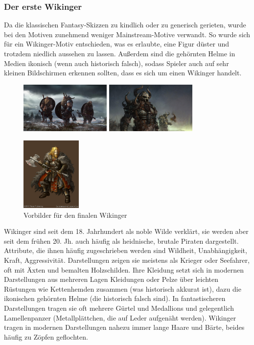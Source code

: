 \documentclass[extern,palatino]{cgBA}
\begin{document}
\subsubsection{Der erste Wikinger}
Da die klassischen Fantasy-Skizzen zu kindlich oder zu generisch gerieten, wurde bei den Motiven zunehmend weniger Mainstream-Motive verwandt. So wurde sich für ein Wikinger-Motiv entschieden, was es erlaubte, eine Figur düster und trotzdem niedlich aussehen zu lassen. Außerdem sind die gehörnten Helme in Medien ikonisch (wenn auch historisch falsch), sodass Spieler auch auf sehr kleinen Bildschirmen erkennen sollten, dass es sich um einen Wikinger handelt.
\begin{figure}[H]
	\raggedleft
	\includegraphics[width=4.5cm]{vikingwallpaper.jpg}
	\centering
	\includegraphics[width=4.5cm]{vikingwallpaper2.jpg}
	\raggedright
	\includegraphics[width=3cm]{vikingwallpaper3.jpg}
	\caption{Vorbilder für den finalen Wikinger}
	\label{inspirations}
\end{figure}
Wikinger sind seit dem 18. Jahrhundert als noble Wilde verklärt, sie werden aber seit dem frühen 20. Jh. auch häufig als heidnische, brutale Piraten dargestellt. Attribute, die ihnen häufig zugeschrieben werden sind Wildheit, Unabhängigkeit, Kraft, Aggressivität. Darstellungen zeigen sie meistens als Krieger oder Seefahrer, oft mit Äxten und bemalten Holzschilden. Ihre Kleidung setzt sich in modernen Darstellungen aus mehreren Lagen Kleidungen oder Pelze über leichten Rüstungen wie Kettenhemden zusammen (was historisch akkurat ist), dazu die ikonischen gehörnten Helme (die historisch falsch sind). In fantastischeren Darstellungen tragen sie oft mehrere Gürtel und Medallions und gelegentlich Lamellenpanzer (Metallplättchen, die auf Leder aufgenäht werden). Wikinger tragen in modernen Darstellungen nahezu immer lange Haare und Bärte, beides häufig zu Zöpfen geflochten. 
\end{document}
